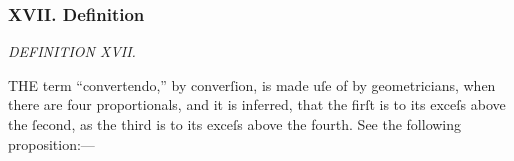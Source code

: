\documentclass[11pt,preview]{standalone}
\begin{document}
\subsubsection{XVII. Definition}

\begin{minipage}{\textwidth}

    \begin{center}
        \textit{DEFINITION XVII.}\label{book5def17} \\
    \end{center}

    \hfill
\end{minipage}

\raggedright T\textsc{HE} term “convertendo,” by converſion, is made uſe of by geometricians, when there are four proportionals, and it is inferred, that the firſt is to its exceſs above the ſecond, as the third is to its exceſs above the fourth. See the following proposition:---
\end{document}
